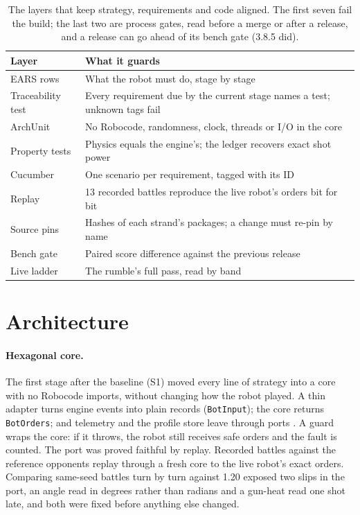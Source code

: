 \documentclass[10pt,twocolumn]{article}
\begin{document}
\begin{table}[t]
\centering
\caption{The layers that keep strategy, requirements and code aligned. The first seven fail the
build; the last two are process gates, read before a merge or after a release, and a release can
go ahead of its bench gate (3.8.5 did).}
\label{tab:honesty}
\small
\begin{tabularx}{\columnwidth}{@{}lX@{}}
\toprule
Layer & What it guards \\
\midrule
EARS rows & What the robot must do, stage by stage \\
Traceability test & Every requirement due by the current stage names a test; unknown tags fail \\
ArchUnit & No Robocode, randomness, clock, threads or I/O in the core \\
Property tests & Physics equals the engine's; the ledger recovers exact shot power \\
Cucumber & One scenario per requirement, tagged with its ID \\
Replay & 13 recorded battles reproduce the live robot's orders bit for bit \\
Source pins & Hashes of each strand's packages; a change must re-pin by name \\
Bench gate & Paired score difference against the previous release \\
Live ladder & The rumble's full pass, read by band \\
\bottomrule
\end{tabularx}
\end{table}

\section{Architecture}\label{sec:arch}

\paragraph{Hexagonal core.} The first stage after the baseline (S1) moved every line of strategy
into a core with no Robocode imports, without changing how the robot played. A thin adapter turns
engine events into plain records (\texttt{BotInput}); the core returns \texttt{BotOrders}; and
telemetry and the profile store leave through ports \cite{cockburn2005}. A guard wraps the core:
if it throws, the robot still receives safe orders and the fault is counted. The port was proved
faithful by replay. Recorded battles against the reference opponents replay through a fresh core
to the live robot's exact orders. Comparing same-seed battles turn by turn against 1.20 exposed
two slips in the port, an angle read in degrees rather than radians and a gun-heat read one shot
late, and both were fixed before anything else changed.
\end{document}
